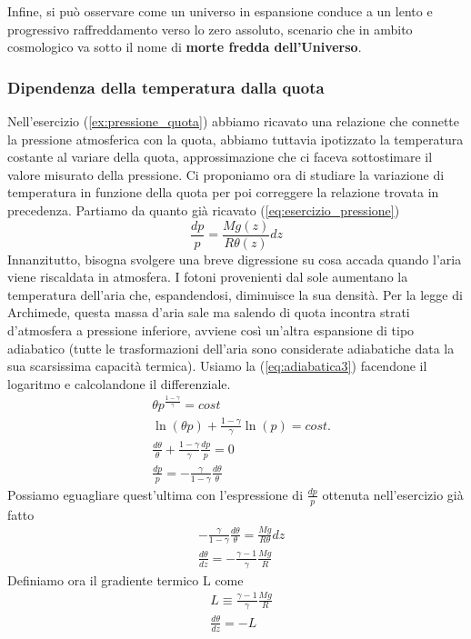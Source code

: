 \documentclass[10pt,a4paper]{article}
\begin{document}
\FloatBarrier
Infine, si può osservare come un universo in espansione conduce a un lento e progressivo
raffreddamento verso lo zero assoluto, scenario che in ambito cosmologico va sotto il nome
di\textbf{ morte fredda dell’Universo}.
\subsubsection{Dipendenza della temperatura dalla quota}
Nell'esercizio (\ref{ex:pressione_quota}) abbiamo ricavato una relazione che connette la pressione atmosferica con la quota, abbiamo tuttavia ipotizzato la temperatura costante al variare della quota, approssimazione che ci faceva sottostimare il valore misurato della pressione. Ci proponiamo ora di studiare la variazione di temperatura in funzione della quota per poi correggere la relazione trovata in precedenza. Partiamo da quanto già ricavato (\ref{eq:esercizio_pressione})
\[\frac{dp}{p} = \frac{M g(z)}{R\theta(z)} dz\]
Innanzitutto, bisogna svolgere una breve digressione su cosa accada quando l'aria viene riscaldata in atmosfera. I fotoni provenienti dal sole aumentano la temperatura dell'aria che, espandendosi, diminuisce la sua densità. Per la legge di Archimede, questa massa d'aria sale ma salendo di quota incontra strati d'atmosfera a pressione inferiore, avviene così un'altra espansione di tipo adiabatico (tutte le trasformazioni dell'aria sono considerate adiabatiche data la sua scarsissima capacità termica). Usiamo la (\ref{eq:adiabatica3}) facendone il logaritmo e calcolandone il differenziale. 
\begin{align*}
	&\theta p^{\frac{1-\gamma}{\gamma}} = cost\\
	&\ln(\theta p) + \frac{1-\gamma}{\gamma}\ln(p) = cost.\\
	&\frac{d\theta}{\theta}+\frac{1-\gamma}{\gamma}\frac{dp}{p} = 0\\
	&\frac{dp}{p} = -\frac{\gamma}{1-\gamma}\frac{d\theta}{\theta}
\end{align*}
Possiamo eguagliare quest'ultima con l'espressione di $\frac{dp}{p}$ ottenuta nell'esercizio già fatto
\begin{align*}
	&-\frac{\gamma}{1-\gamma}\frac{d\theta}{\theta} = \frac{M g}{R \theta}dz\\
	&\frac{d\theta}{dz} = -\frac{\gamma - 1}{\gamma} \frac{M g}{R}
\end{align*}
Definiamo ora il gradiente termico L come
\begin{align*}
	&L \equiv \frac{\gamma - 1}{\gamma} \frac{M g}{R}\\
	&\frac{d\theta}{dz} = -L 
\end{align*}
\end{document}
